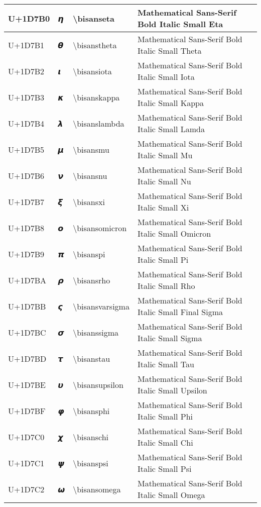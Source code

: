 \begin{table}[h]
\begin{tabulary}{\linewidth}{|L|L|L|L|}
\hline
U+1D7B0 & 𝞰 & {\textbackslash}bisanseta & Mathematical Sans-Serif Bold Italic Small Eta \\
\hline
U+1D7B1 & 𝞱 & {\textbackslash}bisanstheta & Mathematical Sans-Serif Bold Italic Small Theta \\
\hline
U+1D7B2 & 𝞲 & {\textbackslash}bisansiota & Mathematical Sans-Serif Bold Italic Small Iota \\
\hline
U+1D7B3 & 𝞳 & {\textbackslash}bisanskappa & Mathematical Sans-Serif Bold Italic Small Kappa \\
\hline
U+1D7B4 & 𝞴 & {\textbackslash}bisanslambda & Mathematical Sans-Serif Bold Italic Small Lamda \\
\hline
U+1D7B5 & 𝞵 & {\textbackslash}bisansmu & Mathematical Sans-Serif Bold Italic Small Mu \\
\hline
U+1D7B6 & 𝞶 & {\textbackslash}bisansnu & Mathematical Sans-Serif Bold Italic Small Nu \\
\hline
U+1D7B7 & 𝞷 & {\textbackslash}bisansxi & Mathematical Sans-Serif Bold Italic Small Xi \\
\hline
U+1D7B8 & 𝞸 & {\textbackslash}bisansomicron & Mathematical Sans-Serif Bold Italic Small Omicron \\
\hline
U+1D7B9 & 𝞹 & {\textbackslash}bisanspi & Mathematical Sans-Serif Bold Italic Small Pi \\
\hline
U+1D7BA & 𝞺 & {\textbackslash}bisansrho & Mathematical Sans-Serif Bold Italic Small Rho \\
\hline
U+1D7BB & 𝞻 & {\textbackslash}bisansvarsigma & Mathematical Sans-Serif Bold Italic Small Final Sigma \\
\hline
U+1D7BC & 𝞼 & {\textbackslash}bisanssigma & Mathematical Sans-Serif Bold Italic Small Sigma \\
\hline
U+1D7BD & 𝞽 & {\textbackslash}bisanstau & Mathematical Sans-Serif Bold Italic Small Tau \\
\hline
U+1D7BE & 𝞾 & {\textbackslash}bisansupsilon & Mathematical Sans-Serif Bold Italic Small Upsilon \\
\hline
U+1D7BF & 𝞿 & {\textbackslash}bisansphi & Mathematical Sans-Serif Bold Italic Small Phi \\
\hline
U+1D7C0 & 𝟀 & {\textbackslash}bisanschi & Mathematical Sans-Serif Bold Italic Small Chi \\
\hline
U+1D7C1 & 𝟁 & {\textbackslash}bisanspsi & Mathematical Sans-Serif Bold Italic Small Psi \\
\hline
U+1D7C2 & 𝟂 & {\textbackslash}bisansomega & Mathematical Sans-Serif Bold Italic Small Omega \\

\end{tabulary}
\end{table}
